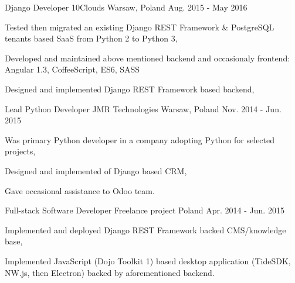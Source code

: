 \begin{cventries}
    \cventry
    {Django Developer} %
    {10Clouds} %
    {Warsaw, Poland} %
    {Aug. 2015 - May 2016} %
    {
        \begin{cvitems} %
            \item {Tested then migrated an existing Django REST Framework \& PostgreSQL tenants based SaaS from Python 2 to Python 3,}
            \item {Developed and maintained above mentioned backend and occasionaly frontend: Angular 1.3, CoffeeScript, ES6, SASS}
            \item {Designed and implemented Django REST Framework based backend,}
        \end{cvitems}
    }

    \cventry
    {Lead Python Developer} %
    {JMR Technologies} %
    {Warsaw, Poland} %
    {Nov. 2014 - Jun. 2015} %
    {
        \begin{cvitems} %
            \item {Was primary Python developer in a company adopting Python for selected projects,}
            \item {Designed and implemented of Django based CRM,}
            \item {Gave occasional assistance to Odoo team.}
        \end{cvitems}
    }

    \cventry
    {Full-stack Software Developer} %
    {Freelance project} %
    {Poland} %
    {Apr. 2014 - Jun. 2015} %
    {
        \begin{cvitems} %
            \item {Implemented and deployed Django REST Framework backed CMS/knowledge base,}
            \item {Implemented JavaScript (Dojo Toolkit 1) based desktop application (TideSDK, NW.js, then Electron) backed by aforementioned backend.}
        \end{cvitems}
    }


\end{cventries}
